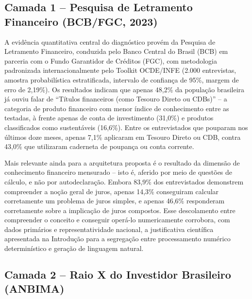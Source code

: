 \subsection{Camada 1 -- Pesquisa de Letramento Financeiro (BCB/FGC, 2023)}
\label{subsec:camada1}

A evid\^encia quantitativa central do diagn\'ostico prov\'em da Pesquisa
de Letramento Financeiro, conduzida pelo Banco Central do Brasil (BCB) em
parceria com o Fundo Garantidor de Cr\'editos (FGC), com metodologia
padronizada internacionalmente pelo Toolkit OCDE/INFE \autocite{bcbfgc2023}
(2.000 entrevistas, amostra probabil\'istica estratificada, intervalo de
confian\c{c}a de 95\%, margem de erro de 2,19\%). Os resultados indicam
que apenas 48,2\% da popula\c{c}\~ao brasileira j\'a ouviu falar de
``T\'itulos financeiros (como Tesouro Direto ou CDBs)'' -- a categoria de
produto financeiro com menor \'indice de conhecimento entre as testadas,
\`a frente apenas de conta de investimento (31,0\%) e produtos
classificados como sustent\'aveis (16,6\%). Entre os entrevistados que
pouparam nos \'ultimos doze meses, apenas 7,1\% aplicaram em Tesouro
Direto ou CDB, contra 43,0\% que utilizaram caderneta de poupan\c{c}a ou
conta corrente.

Mais relevante ainda para a arquitetura proposta \'e o resultado da
dimens\~ao de conhecimento financeiro mensurado -- isto \'e, aferido por
meio de quest\~oes de c\'alculo, e n\~ao por autodeclara\c{c}\~ao. Embora
83,9\% dos entrevistados demonstrem compreender a no\c{c}\~ao geral de
juros, apenas 14,3\% conseguiram calcular corretamente um problema de
juros simples, e apenas 46,6\% responderam corretamente sobre a
implica\c{c}\~ao de juros compostos. Esse descolamento entre compreender
o conceito e conseguir oper\'a-lo numericamente corrobora, com dados
prim\'arios e representatividade nacional, a justificativa cient\'ifica
apresentada na Introdu\c{c}\~ao para a segrega\c{c}\~ao entre
processamento num\'erico determin\'istico e gera\c{c}\~ao de linguagem
natural.

\subsection{Camada 2 -- Raio X do Investidor Brasileiro (ANBIMA)}
\label{subsec:camada2}

